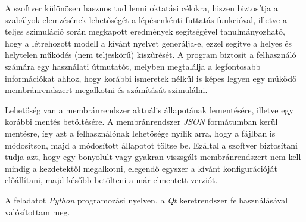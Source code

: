 A szoftver különösen hasznos tud lenni oktatási célokra, hiszen biztosítja a szabályok elemzésének lehetőségét a lépésenkénti futtatás funkcióval, illetve a teljes szimuláció során megkapott eredmények segítségével tanulmányozható, hogy a létrehozott modell a kívánt nyelvet generálja-e, ezzel segítve a helyes és helytelen működés (nem teljeskörű) kiszűrését.
A program biztosít a felhasználó számára egy használati útmutatót, melyben megtalálja a legfontosabb információkat ahhoz, hogy korábbi ismeretek nélkül is képes legyen egy működő membránrendszert megalkotni és számítását szimulálni.

Lehetőség van a membránrendszer aktuális állapotának lementésére, illetve egy korábbi mentés betöltésére. A membránrendszer \textit{JSON} formátumban kerül mentésre, így azt a felhasználónak lehetősége nyílik arra, hogy a fájlban is módosítson, majd a módosított állapotot töltse be. Ezáltal a szoftver biztosítani tudja azt, hogy egy bonyolult vagy gyakran viszsgált membránrendszert nem kell mindig a kezdetektől megalkotni, elegendő egyszer a kívánt konfigurációját előállítani, majd később betölteni a már elmentett verziót.

A feladatot \textit{Python} programozási nyelven, a \textit{Qt} keretrendszer felhasználásával valósítottam meg.